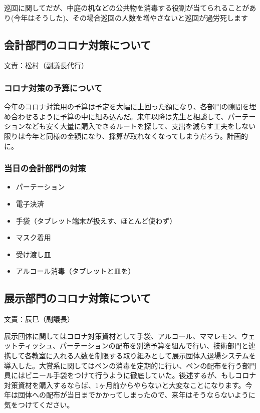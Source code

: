 \documentclass[a4paper]{ltjsreport}
\begin{document}
巡回に関してだが、中庭の机などの公共物を消毒する役割が当てられることがあり(今年はそうした)、その場合巡回の人数を増やさないと巡回が過労死します

\subsection{会計部門のコロナ対策について} 文責：松村（副議長代行） \vspace{2mm}
\subsubsection{コロナ対策の予算について}
今年のコロナ対策用の予算は予定を大幅に上回った額になり、各部門の隙間を埋め合わせるように予算の中に組み込んだ。来年以降は先生と相談して、パーテーションなども安く大量に購入できるルートを探して、支出を減らす工夫をしない限りは今年と同様の金額になり、採算が取れなくなってしまうだろう。計画的に。

\subsubsection{当日の会計部門の対策}
\begin{itemize}
  \item パーテーション
  \item 電子決済
  \item 手袋（タブレット端末が扱えす、ほとんど使わず）
  \item マスク着用
  \item 受け渡し皿
  \item アルコール消毒（タブレットと皿を）
\end{itemize}

\subsection{展示部門のコロナ対策について} 文責：辰巳（副議長） \vspace{2mm}

展示団体に関してはコロナ対策資材として手袋、アルコール、ママレモン、ウェットティッシュ、パーテーションの配布を別途予算を組んで行い、技術部門と連携して各教室に入れる人数を制限する取り組みとして展示団体入退場システムを導入した。大賞系に関してはペンの消毒を定期的に行い、ペンの配布を行う部門員にはビニール手袋をつけて行うように徹底していた。後述するが、もしコロナ対策資材を購入するならば、1ヶ月前からやらないと大変なことになります。今年は団体への配布が当日までかかってしまったので、来年はそうならないように気をつけてください。
\end{document}
